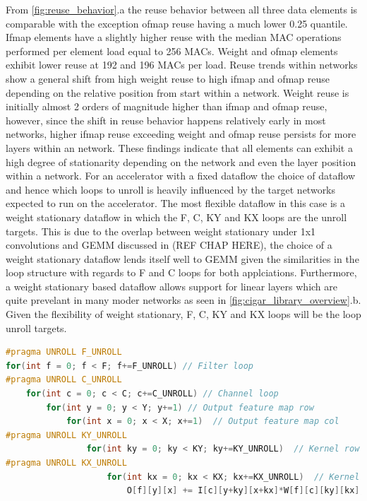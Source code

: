 From \autoref{fig:reuse_behavior}.a the reuse
behavior between all three data elements is comparable with the exception ofmap
reuse having a much lower 0.25 quantile. Ifmap elements have a slightly higher
reuse with the median MAC operations performed per element load equal to 256
MACs. Weight and ofmap elements exhibit lower reuse at 192 and 196 MACs per
load. Reuse trends within networks show a general shift from high weight reuse
to high ifmap and ofmap reuse depending on the relative position from start
within a network. Weight reuse is initially almost 2 orders of magnitude higher
than ifmap and ofmap reuse, however, since the shift in reuse behavior happens
relatively early in most networks, higher ifmap reuse exceeding weight and ofmap
reuse persists for more layers within an network. These findings indicate that
all elements can exhibit a high degree of stationarity depending on the network and
even the layer position within a network. For an accelerator with a fixed
dataflow the choice of dataflow and hence which loops to unroll is heavily
influenced by the target networks expected to run on the accelerator.
The most flexible dataflow in this case is a weight stationary dataflow in which
the F, C, KY and KX loops are the unroll targets. This is due to the overlap
between weight stationary under 1x1 convolutions and GEMM discussed in (REF CHAP HERE), the choice of a weight
stationary dataflow lends itself well to \ac{GEMM} given the similarities in the
loop structure with regards to F and C loops for both applciations. Furthermore,
a weight stationary based dataflow allows support for linear layers which are
quite prevelant in many moder networks as seen in
\autoref{fig:cigar_library_overview}.b. Given the flexibility of weight
stationary, F, C, KY and KX loops will be the loop unroll targets. 

\clearpage
\begin{lstlisting}[language=C, caption=Weight stationary dataflow, label={lst:conv_loop}]
#pragma UNROLL F_UNROLL
for(int f = 0; f < F; f+=F_UNROLL) // Filter loop
#pragma UNROLL C_UNROLL
    for(int c = 0; c < C; c+=C_UNROLL) // Channel loop
        for(int y = 0; y < Y; y+=1) // Output feature map row
            for(int x = 0; x < X; x+=1)  // Output feature map col
#pragma UNROLL KY_UNROLL
                for(int ky = 0; ky < KY; ky+=KY_UNROLL)  // Kernel row
#pragma UNROLL KX_UNROLL
                    for(int kx = 0; kx < KX; kx+=KX_UNROLL)  // Kernel col
                        O[f][y][x] += I[c][y+ky][x+kx]*W[f][c][ky][kx];
\end{lstlisting}

